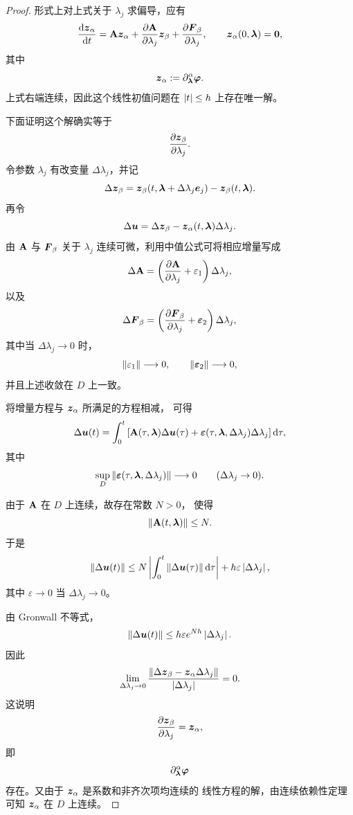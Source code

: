 \begin{proof}
	形式上对上式关于 $\lambda_j$ 求偏导，应有
	\[
	\frac{\mathrm{d}\boldsymbol{z}_{\alpha}}{\mathrm{d} t}
	=
	\mathbf{A}\boldsymbol{z}_{\alpha}
	+
	\frac{\partial\mathbf{A}}{\partial\lambda_j}
	\boldsymbol{z}_{\beta}
	+
	\frac{\partial\boldsymbol{F}_{\beta}}{\partial\lambda_j},
	\qquad
	\boldsymbol{z}_{\alpha}(0,\boldsymbol{\lambda})=\boldsymbol{0},
	\]
	其中
	\[
	\boldsymbol{z}_{\alpha}
	\mathrel{:=}
	\partial_{\boldsymbol{\lambda}}^\alpha
	\boldsymbol{\varphi}.
	\]
	上式右端连续，因此这个线性初值问题在
	$\left| t \right|\leq h$ 上存在唯一解。
	
	下面证明这个解确实等于
	\[
	\frac{\partial\boldsymbol{z}_{\beta}}{\partial\lambda_j}.
	\]
	令参数 $\lambda_j$ 有改变量 $\Delta\lambda_j$，并记
	\[
	\Delta\boldsymbol{z}_{\beta}
	=
	\boldsymbol{z}_{\beta}
	(t,\boldsymbol{\lambda}+\Delta\lambda_j\boldsymbol{e}_j)
	-
	\boldsymbol{z}_{\beta}(t,\boldsymbol{\lambda}).
	\]
	再令
	\[
	\Delta\boldsymbol{u}
	=
	\Delta\boldsymbol{z}_{\beta}
	-
	\boldsymbol{z}_{\alpha}(t,\boldsymbol{\lambda})
	\Delta\lambda_j.
	\]
	由 $\mathbf{A}$ 与 $\boldsymbol{F}_{\beta}$ 关于 $\lambda_j$
	连续可微，利用中值公式可将相应增量写成
	\[
	\Delta\mathbf{A}
	=
	\left(
	\frac{\partial\mathbf{A}}{\partial\lambda_j}
	+\mathbf{\varepsilon}_1
	\right)\Delta\lambda_j,
	\]
	以及
	\[
	\Delta\boldsymbol{F}_{\beta}
	=
	\left(
	\frac{\partial\boldsymbol{F}_{\beta}}{\partial\lambda_j}
	+\boldsymbol{\varepsilon}_2
	\right)\Delta\lambda_j,
	\]
	其中当 $\Delta\lambda_j\to0$ 时，
	\[
	\left\| \mathbf{\varepsilon}_1 \right\|\longrightarrow0,
	\qquad
	\left\| \boldsymbol{\varepsilon}_2 \right\|\longrightarrow0,
	\]
	并且上述收敛在 $D$ 上一致。
	
	将增量方程与 $\boldsymbol{z}_{\alpha}$ 所满足的方程相减，
	可得
	\[
	\Delta\boldsymbol{u}(t)
	=
	\int_0^t
	\left[
	\mathbf{A}(\tau,\boldsymbol{\lambda})
	\Delta\boldsymbol{u}(\tau)
	+
	\boldsymbol{\varepsilon}
	(\tau,\boldsymbol{\lambda},\Delta\lambda_j)
	\Delta\lambda_j
	\right]\mathrm{d}\tau,
	\]
	其中
	\[
	\sup_D
	\left\| 
		\boldsymbol{\varepsilon}
		(\tau,\boldsymbol{\lambda},\Delta\lambda_j)
	 \right\|
	\longrightarrow0
	\qquad
	(\Delta\lambda_j\to0).
	\]
	
	由于 $\mathbf{A}$ 在 $D$ 上连续，故存在常数 $N>0$，
	使得
	\[
	\left\| \mathbf{A}(t,\boldsymbol{\lambda}) \right\|\leq N.
	\]
	于是
	\[
	\left\| \Delta\boldsymbol{u}(t) \right\|
	\leq
	N
	\left| 
		\int_0^t
		\left\| \Delta\boldsymbol{u}(\tau) \right\|
		\mathrm{d}\tau
	 \right|
	+
	h\varepsilon
	\left| \Delta\lambda_j \right|,
	\]
	其中 $\varepsilon\to0$ 当
	$\Delta\lambda_j\to0$。
	
	由 Gronwall 不等式，
	\[
	\left\| \Delta\boldsymbol{u}(t) \right\|
	\leq
	h\varepsilon
	e^{Nh}
	\left| \Delta\lambda_j \right|.
	\]
	因此
	\[
	\lim_{\Delta\lambda_j\to0}
	\frac{
		\left\| 
			\Delta\boldsymbol{z}_{\beta}
			-
			\boldsymbol{z}_{\alpha}
			\Delta\lambda_j
		 \right\|
	}{
		\left| \Delta\lambda_j \right|
	}
	=0.
	\]
	这说明
	\[
	\frac{\partial\boldsymbol{z}_{\beta}}{\partial\lambda_j}
	=
	\boldsymbol{z}_{\alpha},
	\]
	即
	\[
	\partial_{\boldsymbol{\lambda}}^\alpha
	\boldsymbol{\varphi}
	\]
	存在。又由于 $\boldsymbol{z}_{\alpha}$ 是系数和非齐次项均连续的
	线性方程的解，由连续依赖性定理可知
	$\boldsymbol{z}_{\alpha}$ 在 $D$ 上连续。
	

\end{proof}

